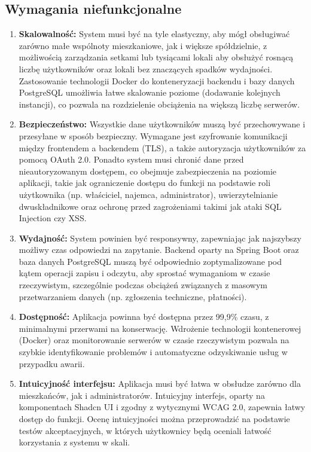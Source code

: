 \subsection{Wymagania niefunkcjonalne}

\begin{enumerate}[label=\arabic*.] 

	\item \textbf{Skalowalność:} System musi być na tyle elastyczny, aby mógł obsługiwać zarówno małe wspólnoty mieszkaniowe, jak i większe spółdzielnie, z możliwością zarządzania setkami lub tysiącami lokali aby obsłużyć rosnącą liczbę użytkowników oraz lokali bez znaczących spadków wydajności. Zastosowanie technologii Docker do konteneryzacji backendu i bazy danych PostgreSQL umożliwia łatwe skalowanie poziome (dodawanie kolejnych instancji), co pozwala na rozdzielenie obciążenia na większą liczbę serwerów.

	\item \textbf{Bezpieczeństwo:} Wszystkie dane użytkowników muszą być przechowywane i przesyłane w sposób bezpieczny. Wymagane jest szyfrowanie komunikacji między frontendem a backendem (TLS), a także autoryzacja użytkowników za pomocą OAuth 2.0. Ponadto system musi chronić dane przed nieautoryzowanym dostępem, co obejmuje zabezpieczenia na poziomie aplikacji, takie jak ograniczenie dostępu do funkcji na podstawie roli użytkownika (np. właściciel, najemca, administrator), uwierzytelnianie dwuskładnikowe oraz ochronę przed zagrożeniami takimi jak ataki SQL Injection czy XSS.

	\item \textbf{Wydajność:} System powinien być responsywny, zapewniając jak najszybszy możliwy czas odpowiedzi na zapytanie. Backend oparty na Spring Boot oraz baza danych PostgreSQL muszą być odpowiednio zoptymalizowane pod kątem operacji zapisu i odczytu, aby sprostać wymaganiom w czasie rzeczywistym, szczególnie podczas obciążeń związanych z masowym przetwarzaniem danych (np. zgłoszenia techniczne, płatności).

	\item \textbf{Dostępność:} Aplikacja powinna być dostępna przez 99,9\% czasu, z minimalnymi przerwami na konserwację. Wdrożenie technologii kontenerowej (Docker) oraz monitorowanie serwerów w czasie rzeczywistym pozwala na szybkie identyfikowanie problemów i automatyczne odzyskiwanie usług w przypadku awarii.

	\item \textbf{Intuicyjność interfejsu:} Aplikacja musi być łatwa w obsłudze zarówno dla mieszkańców, jak i administratorów. Intuicyjny interfejs, oparty na komponentach Shadcn UI i zgodny z wytycznymi WCAG 2.0, zapewnia łatwy dostęp do funkcji. Ocenę intuicyjności można przeprowadzić na podstawie testów akceptacyjnych, w których użytkownicy będą oceniali łatwość korzystania z systemu w skali.
	

\end{enumerate}
